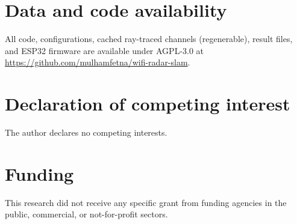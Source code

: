 \documentclass[preprint,12pt]{elsarticle}
\begin{document}
\section*{Data and code availability}
All code, configurations, cached ray-traced channels (regenerable), result files, and ESP32
firmware are available under AGPL-3.0 at \url{https://github.com/mulhamfetna/wifi-radar-slam}.

\section*{Declaration of competing interest}
The author declares no competing interests.

\section*{Funding}
This research did not receive any specific grant from funding agencies in the public,
commercial, or not-for-profit sectors.



\end{document}
